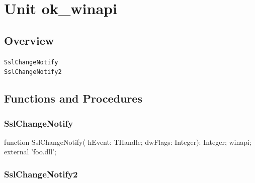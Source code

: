 \documentclass{report}
\newif\ifpdf
\begin{document}
\label{toc}\tableofcontents
\newpage
\newlength{\tmplength}
\chapter{Unit ok{\_}winapi}
\label{ok_winapi}
\section{Overview}
\begin{description}
\item[\texttt{SslChangeNotify}]
\item[\texttt{SslChangeNotify2}]
\end{description}
\section{Functions and Procedures}
\ifpdf
\subsection*{\large{\textbf{SslChangeNotify}}\normalsize\hspace{1ex}\hrulefill}
\else
\subsection*{SslChangeNotify}
\fi
\label{ok_winapi-SslChangeNotify}
\begin{list}{}{
\setlength{\itemindent}{0cm}
\setlength{\listparindent}{0cm}
\setlength{\leftmargin}{\evensidemargin}
\addtolength{\leftmargin}{\tmplength}
\settowidth{\labelsep}{X}
\addtolength{\leftmargin}{\labelsep}
\setlength{\labelwidth}{\tmplength}
}
\item[\textbf{Declaration}\hfill]
\ifpdf
\begin{flushleft}
\fi
\begin{ttfamily}
function SslChangeNotify( hEvent: THandle; dwFlags: Integer): Integer; winapi; external 'foo.dll';\end{ttfamily}

\ifpdf
\end{flushleft}
\fi

\end{list}
\ifpdf
\subsection*{\large{\textbf{SslChangeNotify2}}\normalsize\hspace{1ex}\hrulefill}
\else
\end{document}
